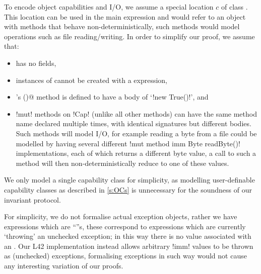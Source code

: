 \noindent To encode object capabilities and I/O, we assume a special location  $c$ of class \Q@Cap@. This location can be used in the main expression and would refer to an object with methods that behave non-deterministically, such methods would model operations such as file reading/writing. In order to simplify our proof, we assume that:
\begin{itemize}
	\item \Q@Cap@ has no fields,
	\item instances of \Q@Cap@ cannot be created with a \Q@new@ expression,
	\item \Q@Cap@'s \Q@invariant()@ method is defined to have a body of `\Q!new True()!', and
	

	
	\item \Q!mut! methods on \Q!Cap! (unlike all other methods) can have the same method name declared multiple times, with identical signatures but different bodies.
	Such methods will model I/O, for example reading a byte from a file could be modelled by having several different \Q!mut method imm Byte readByte()! implementations, each of which returns a different byte value,
	a call to such a method will then non-deterministically reduce to one of these values.
\end{itemize}
We only model a single \Q@Cap@ capability class for simplicity, as modelling user-definable capability classes as described in \autoref{s:OCs} is unnecessary for the soundness of our invariant protocol.

For simplicity, we do not formalise actual exception objects, rather we have expressions which are ``\error''s, these correspond to expressions which are currently `throwing' an unchecked exception;
in this way there is no value associated with an \error.
Our L42 implementation instead allows arbitrary \Q!imm! values to be thrown as (unchecked) exceptions, formalising exceptions in such way would not cause any interesting variation of our proofs.

